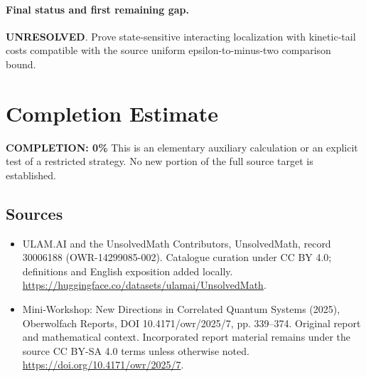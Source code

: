 \documentclass[11pt]{article}
\begin{document}
\paragraph{Final status and first remaining gap.}
\textbf{UNRESOLVED}. Prove state-sensitive interacting localization with kinetic-tail costs compatible with the source uniform epsilon-to-minus-two comparison bound.

\section{Completion Estimate}
\noindent\textbf{COMPLETION: 0\%}
This is an elementary auxiliary calculation or an explicit test of a restricted strategy. No new portion of the full source target is established.

\subsection{Sources}
\begin{itemize}
\item[\hypertarget{source:30006188:1}{S1}] ULAM.AI and the UnsolvedMath Contributors, UnsolvedMath, record 30006188 (OWR-14299085-002). Catalogue curation under CC BY 4.0; definitions and English exposition added locally.
\url{https://huggingface.co/datasets/ulamai/UnsolvedMath}.
\item[\hypertarget{source:30006188:2}{S2}] Mini-Workshop: New Directions in Correlated Quantum Systems (2025), Oberwolfach Reports, DOI 10.4171/owr/2025/7, pp. 339--374. Original report and mathematical context. Incorporated report material remains under the source CC BY-SA 4.0 terms unless otherwise noted.
\url{https://doi.org/10.4171/owr/2025/7}.
\end{itemize}
\label{end:30006188}
\end{document}

